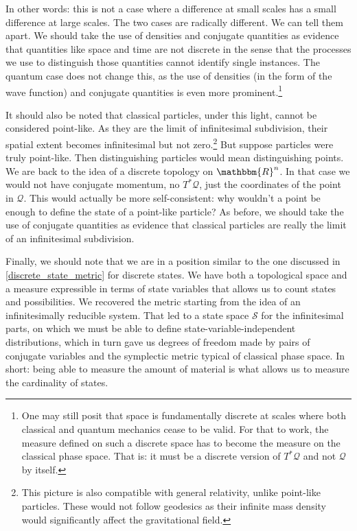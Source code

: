 \documentclass[aps,pra,10pt,twocolumn,floatfix,nofootinbib]{revtex4-1}
\numberwithin{equation}{section}
\theoremstyle{definition}
\begin{document}
In other words: this is not a case where a difference at  small scales has a small difference at large scales. The two cases are radically different. We can tell them apart. We should take the use of densities and conjugate quantities as evidence that quantities like space and time are not discrete in the sense that the processes we use to distinguish those quantities cannot identify single instances. The quantum case does not change this, as the use of densities (in the form of the wave function) and conjugate quantities is even more prominent.\footnote{One may still posit that space is fundamentally discrete at scales where both classical and quantum mechanics cease to be valid. For that to work, the measure defined on such a discrete space has to become the measure on the classical phase space. That is: it must be a discrete version of $T^*\mathcal{Q}$ and not $\mathcal{Q}$ by itself.}

It should also be noted that classical particles, under this light, cannot be considered point-like. As they are the limit of infinitesimal subdivision, their spatial extent becomes infinitesimal but not zero.\footnote{This picture is also compatible with general relativity, unlike point-like particles. These would not follow geodesics as their infinite mass density would significantly affect the gravitational field.} But suppose particles were truly point-like. Then distinguishing particles would mean distinguishing points. We are back to the idea of a discrete topology on $\mathbbm{R}^n$. In that case we would not have conjugate momentum, no $T^*\mathcal{Q}$, just the coordinates of the point in $\mathcal{Q}$. This would actually be more self-consistent: why wouldn't a point be enough to define the state of a point-like particle? As before, we should take the use of conjugate quantities as evidence that classical particles are really the limit of an infinitesimal subdivision.

Finally, we should note that we are in a position similar to the one discussed in \ref{discrete_state_metric} for discrete states. We have both a topological space and a measure expressible in terms of state variables that allows us to count states and possibilities. We recovered the metric starting from the idea of an infinitesimally reducible system. That led to a state space $\mathcal{S}$ for the infinitesimal parts, on which we must be able to define state-variable-independent distributions, which in turn gave us degrees of freedom made by pairs of conjugate variables and the symplectic metric typical of classical phase space. In short: being able to measure the amount of material is what allows us to measure the cardinality of states.
\end{document}
